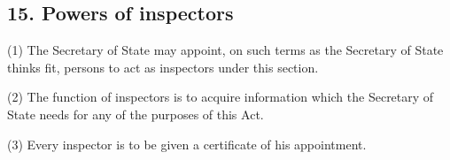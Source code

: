 \documentclass[12pt,a4paper]{article}
\begin{document}
\subsection{15. Powers of inspectors}

%
%
%
%
%

(1) The 
Secretary of State  %
may appoint, on such terms as 
the Secretary of State  %
thinks fit, persons to act as inspectors under this section.

(2) The function of inspectors is to acquire information which the 
Secretary of State  %
needs for any of the purposes of this Act.

(3) Every inspector is to be given a certificate of his appointment.
\end{document}
